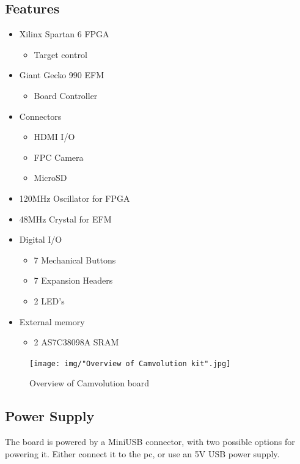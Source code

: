 \subsection{Features}
\begin{itemize}
    \item Xilinx Spartan 6 FPGA
        \begin{itemize}
            \item Target control
        \end{itemize}
    \item Giant Gecko 990 EFM
        \begin{itemize}
            \item Board Controller
        \end{itemize}
    \item Connectors
        \begin{itemize}
            \item HDMI I/O
            \item FPC Camera
            \item MicroSD
        \end{itemize}
    \item 120MHz Oscillator for FPGA
    \item 48MHz Crystal for EFM
    \item Digital I/O
        \begin{itemize}
            \item 7 Mechanical Buttons
            \item 7 Expansion Headers
            \item 2 LED's
        \end{itemize}
    \item External memory
        \begin{itemize}
            \item 2 AS7C38098A SRAM
        \end{itemize}

\end{itemize}


\begin{figure}
    \texttt{[image: img/"Overview of Camvolution kit".jpg]}
    \caption{Overview of Camvolution board}
    \label{fig:board_layout}
\end{figure}

\subsection{Power Supply}
The board is powered by a MiniUSB connector, with two possible options for powering it. Either connect it to the pc, or use an 5V USB power supply.

